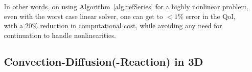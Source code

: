 In other words, on using Algorithm~\ref{alg:refSeries} for a highly nonlinear problem, even with the worst case linear solver, one can get to $<1\%$ error in the QoI, with a $20\%$ reduction in computational cost, while avoiding any need for continuation to handle nonlinearities. 
%
\subsection{Convection-Diffusion(-Reaction) in 3D} 
